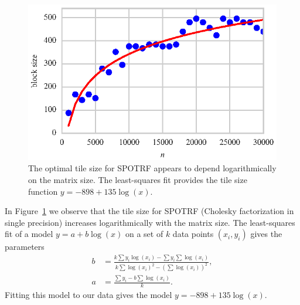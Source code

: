 \documentclass[a4paper,12pt]{article}
\begin{document}
\begin{figure}[ht]
  \centering
  \includegraphics[scale=1]{fig/curvefit_log.eps}
  \caption{The optimal tile size for SPOTRF appears to depend
    logarithmically on the matrix size.
    The least-squares fit provides the tile size function
    $y = -898 + 135\log(x)$.}
  \label{fig.fit_log}
\end{figure}
In Figure~\ref{fig.fit_log} we observe that the tile size for
SPOTRF (Cholesky factorization in single precision)
increases logarithmically with the matrix size.
The least-squares fit of a model $y = a + b\log(x)$ on
a set of $k$ data points $(x_i, y_i)$ gives the parameters
\begin{align*}
  b &= \frac{k \sum y_i \log(x_i) - \sum y_i \sum \log(x_i)}
            {k \sum\log(x_i)^2 - (\sum \log(x_i))^2},\\
  a &= \frac{\sum y_i - b \sum\log(x_i)}{k}.
\end{align*}
Fitting this model to our data gives the model
$y = -898 + 135 \log(x)$.
\end{document}
